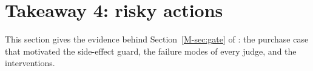 \section{Takeaway 4: risky actions}\label{sec:e}

This section gives the evidence behind Section~\ref{M-sec:gate} of \mainpaper{}: the purchase case that motivated
the side-effect guard, the failure modes of every judge, and the interventions.




